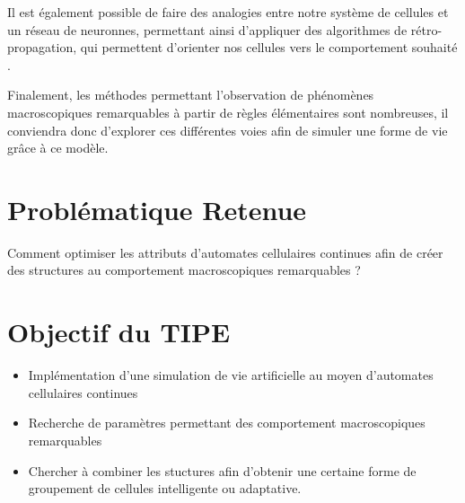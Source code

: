 \documentclass[a4paper, 11pt]{article}
\let\cite=\supercite
\begin{document}
Il est également possible de faire des analogies entre notre système de cellules et un
réseau de neuronnes, permettant ainsi d'appliquer des algorithmes de rétro-propagation,
qui permettent d'orienter nos cellules vers le comportement souhaité 
\cite{hamon:hal-03519319}.

Finalement, les méthodes permettant l'observation de phénomènes macroscopiques
remarquables à partir de règles élémentaires sont nombreuses, il conviendra donc
d'explorer ces différentes voies afin de simuler une forme de vie grâce à ce modèle.


\section*{Probl\'ematique Retenue}

Comment optimiser les attributs d'automates cellulaires continues afin de créer des
structures au comportement macroscopiques remarquables ?

\section*{Objectif du TIPE}

\begin{itemize}
    \item Implémentation d'une simulation de vie artificielle au moyen d'automates
        cellulaires continues
    \item Recherche de paramètres permettant des comportement macroscopiques
        remarquables
    \item Chercher à combiner les stuctures afin d'obtenir une certaine forme de
        groupement de cellules intelligente ou adaptative.
\end{itemize}

\printbibliography[title=Références bibliographiques] 
\end{document}
